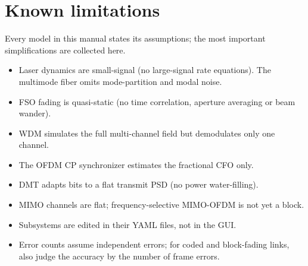 \section{Known limitations}
Every model in this manual states its assumptions; the most important simplifications are
collected here.
\begin{itemize}
  \item Laser dynamics are small-signal (no large-signal rate equations). The multimode fiber
  omits mode-partition and modal noise.
  \item FSO fading is quasi-static (no time correlation, aperture averaging or beam wander).
  \item WDM simulates the full multi-channel field but demodulates only one channel.
  \item The OFDM CP synchronizer estimates the fractional CFO only.
  \item DMT adapts bits to a flat transmit PSD (no power water-filling).
  \item MIMO channels are flat; frequency-selective MIMO-OFDM is not yet a block.
  \item Subsystems are edited in their YAML files, not in the GUI.
  \item Error counts assume independent errors; for coded and block-fading links, also judge
  the accuracy by the number of frame errors.
\end{itemize}
